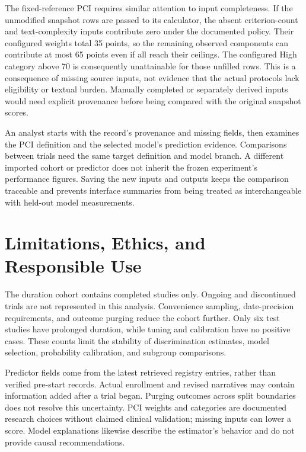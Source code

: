 \documentclass[10pt,letterpaper,twocolumn]{article}
\begin{document}
The fixed-reference PCI requires similar attention to input completeness. If the unmodified snapshot rows are passed to its calculator, the absent criterion-count and text-complexity inputs contribute zero under the documented policy. Their configured weights total 35 points, so the remaining observed components can contribute at most 65 points even if all reach their ceilings. The configured High category above 70 is consequently unattainable for those unfilled rows. This is a consequence of missing source inputs, not evidence that the actual protocols lack eligibility or textual burden. Manually completed or separately derived inputs would need explicit provenance before being compared with the original snapshot scores.

An analyst starts with the record's provenance and missing fields, then examines the PCI definition and the selected model's prediction evidence. Comparisons between trials need the same target definition and model branch. A different imported cohort or predictor does not inherit the frozen experiment's performance figures. Saving the new inputs and outputs keeps the comparison traceable and prevents interface summaries from being treated as interchangeable with held-out model measurements.

\section{Limitations, Ethics, and Responsible Use}

The duration cohort contains completed studies only. Ongoing and discontinued trials are not represented in this analysis. Convenience sampling, date-precision requirements, and outcome purging reduce the cohort further. Only six test studies have prolonged duration, while tuning and calibration have no positive cases. These counts limit the stability of discrimination estimates, model selection, probability calibration, and subgroup comparisons.

Predictor fields come from the latest retrieved registry entries, rather than verified pre-start records. Actual enrollment and revised narratives may contain information added after a trial began. Purging outcomes across split boundaries does not resolve this uncertainty. PCI weights and categories are documented research choices without claimed clinical validation; missing inputs can lower a score. Model explanations likewise describe the estimator's behavior and do not provide causal recommendations.
\end{document}
